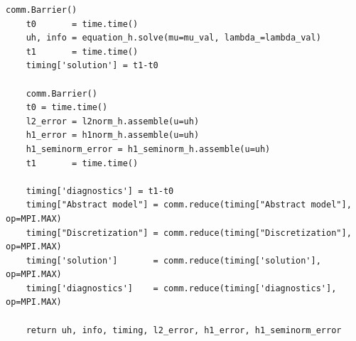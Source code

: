 \documentclass[a4paper,12pt,twoside]{report}
\begin{document}
\begin{lstlisting}[caption=Simulation code for the linear elasticity problem with Dirichlet boundary conditions.]
    comm.Barrier()
    t0       = time.time()
    uh, info = equation_h.solve(mu=mu_val, lambda_=lambda_val)
    t1       = time.time()
    timing['solution'] = t1-t0

    comm.Barrier()
    t0 = time.time()
    l2_error = l2norm_h.assemble(u=uh)
    h1_error = h1norm_h.assemble(u=uh)
    h1_seminorm_error = h1_seminorm_h.assemble(u=uh)
    t1       = time.time()

    timing['diagnostics'] = t1-t0
    timing["Abstract model"] = comm.reduce(timing["Abstract model"], op=MPI.MAX)
    timing["Discretization"] = comm.reduce(timing["Discretization"], op=MPI.MAX)
    timing['solution']       = comm.reduce(timing['solution'], op=MPI.MAX)
    timing['diagnostics']    = comm.reduce(timing['diagnostics'], op=MPI.MAX)

    return uh, info, timing, l2_error, h1_error, h1_seminorm_error
\end{lstlisting}
\end{document}
